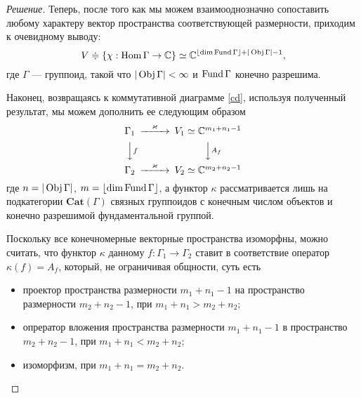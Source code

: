 \begin{proof}[Решение]
    Теперь, после того как мы можем взаимооднозначно сопоставить любому 
    характеру вектор пространства соответствующей размерности, приходим к 
    очевидному выводу: 
    \begin{equation}
        V \doteqdot \{\chi: \operatorname*{Hom} \Gamma \to \mathbb{C}\} \simeq 
        \mathbb{C}^{\lfloor \dim \operatorname*{Fund} \Gamma \rfloor + |\operatorname*{Obj} \Gamma| - 1},
    \end{equation}
    где $\Gamma$ --- группоид, такой что $|\operatorname*{Obj} \Gamma| < \infty$ и 
    $\operatorname*{Fund} \Gamma$ конечно разрешима.
    
    \bigskip

    Наконец, возвращаясь к коммутативной диаграмме \eqref{cd}, используя 
    полученный результат, мы можем дополнить ее следующим образом
    \begin{equation}
        \begin{CD}
            \Gamma_1 @>\kappa>> V_1 \simeq \mathbb{C}^{m_1 + n_1 - 1}\\
            @VVfV          @VVA_fV\\
            \Gamma_2 @>\kappa>> V_2 \simeq \mathbb{C}^{m_2 + n_2 - 1}
        \end{CD}
    \end{equation}
    где $n = |\operatorname*{Obj} \Gamma|$, $m = \lfloor \dim \operatorname*{Fund} \Gamma \rfloor$, а функтор $\kappa$ 
    рассматривается лишь на подкатегории $\mathbf{Cat}(\Gamma)$ связных 
    группоидов с конечным числом объектов и конечно разрешимой фундаментальной 
    группой.

    Поскольку все конечномерные векторные пространства изоморфны, можно считать, 
    что функтор $\kappa$ данному $f:\Gamma_1 \to \Gamma_2$ 
    ставит в соответствие оператор $\kappa(f) = A_f$, который, не ограничивая 
    общности, суть есть
    \begin{itemize}
        \item проектор пространства размерности $m_1 + n_1 - 1$ на 
        пространство размерности $m_2 + n_2 - 1$, при $m_1 + n_1 > m_2 + n_2$;
        \item опрератор вложения пространства размерности $m_1 + n_1 - 1$ в 
        пространство $m_2 + n_2 - 1$, при $m_1 + n_1 < m_2 + n_2$;
        \item изоморфизм, при $m_1 + n_1 = m_2 + n_2$.
    \end{itemize}
\end{proof}